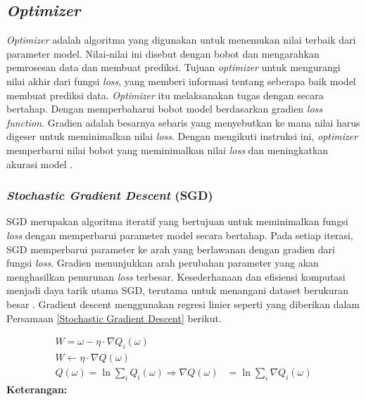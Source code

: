         

\subsection{\textit{Optimizer}}

\textit{Optimizer} adalah algoritma yang digunakan untuk menemukan nilai terbaik dari parameter model. Nilai-nilai ini disebut dengan bobot dan mengarahkan pemrosesan data dan membuat prediksi. Tujuan \textit{optimizer} untuk mengurangi nilai akhir dari fungsi \textit{loss}, yang memberi informasi tentang seberapa baik model membuat prediksi data. \textit{Optimizer} itu melaksanakan tugas dengan secara bertahap. Dengan memperbaharui bobot model berdasarkan gradien \textit{loss function}. Gradien adalah besarnya sebaris yang menyebutkan ke mana nilai harus digeser untuk meminimalkan nilai \textit{loss}. Dengan mengikuti instruksi ini, \textit{optimizer} memperbarui nilai bobot yang meminimalkan nilai \textit{loss} dan meningkatkan akurasi model \cite{ruder2017overview}.



\subsubsection{\textit{Stochastic Gradient Descent} (SGD)}

SGD merupakan algoritma iteratif yang bertujuan untuk meminimalkan fungsi \textit{loss} dengan memperbarui parameter model secara bertahap.  Pada setiap iterasi, SGD memperbarui parameter ke arah yang berlawanan dengan gradien dari fungsi \textit{loss}.  Gradien menunjukkan arah perubahan parameter yang akan menghasilkan penurunan \textit{loss} terbesar.  Kesederhanaan dan efisiensi komputasi menjadi daya tarik utama SGD, terutama untuk menangani dataset berukuran besar \cite{math11061360}.
Gradient descent menggunakan regresi linier seperti yang diberikan dalam Persamaan \ref{Stochastic Gradient Descent} berikut.

\begin{equation}
\begin{aligned}
    W = \omega - \eta \cdot \nabla Q_i(\omega) \\
    W \leftarrow \eta \cdot \nabla Q(\omega) \\
    Q(\omega) = \ln \sum_i Q_i(\omega) 
    \Rightarrow \nabla Q(\omega) &= \ln \sum_i \nabla Q_i(\omega)
\end{aligned}
\label{Stochastic Gradient Descent}
\end{equation}
     \textbf{Keterangan:}
     
